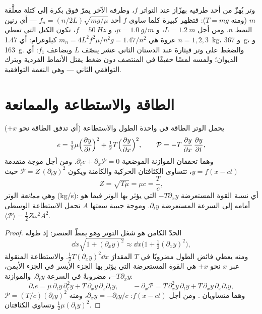 \begin{example}\label{ex:b2:waves-on-strings:melde}
وتر يُهزّ من أحد طرفيه بهزّاز عند التواتر $f$، وطرفه الآخر
يمرّ فوق بكرة إلى كتلة معلَّقة $m$ (ومنه $T = mg$): فتظهر  كبيرة كلما ساوى $f$ أحد $f_n = (n/2L)
\sqrt{mg/\mu}$ --- أي رنين النمط $n$. ومن أجل $L = \qty{1.2}{m}$، و $\mu =
\qty{1.0}{g/m}$، و $f = \qty{50}{Hz}$، تكون الكتل التي تعطي $n = 1, 2, 3$ عروة
هي $m_n = 4L^2f^2\mu/n^2g = 1.47/n^2$ كيلوغرام: أي \qty{1.47}{kg}، و \qty{367}{g}، و \qty{163}{g}.
والضغط على وتر قيثارة عند الدستان الثاني عشر ينصّف $L$ ويضاعف
$f_1$: أي الديوان؛ ولمسه لمسًا خفيفًا في المنتصف دون ضغط
يقتل الأنماط الفردية ويترك التوافقي الثاني --- وهي النغمة التوافقية.
\end{example}

\section{الطاقة والاستطاعة والممانعة}

\begin{proposition}\label{prop:b2:waves-on-strings:energy}
يحمل الوتر الطاقة في واحدة الطول والاستطاعة (أي تدفق الطاقة
نحو $+x$)
\[
e = \tfrac12\mu\Bigl(\frac{\partial y}{\partial t}\Bigr)^2 + \tfrac12T\Bigl(\frac{\partial y}{\partial x}\Bigr)^2 ,
\qquad
\mathcal P = -T\,\frac{\partial y}{\partial x}\,\frac{\partial y}{\partial t} ,
\]
وهما تحققان الموازنة الموضعية $\partial_te + \partial_x\mathcal P = 0$. ومن أجل
موجة متقدمة $y = f(x - ct)$، تتساوى الكثافتان الحركية والكامنة
ويكون $\mathcal P = Z\,(\partial_ty)^2$ حيث
\[
Z = \sqrt{T\mu} = \mu c = \frac Tc ,
\]
وهي \emph{ممانعة} الوتر (\unit{kg/s}): أي نسبة القوة
المستعرضة $-T\partial_xy$ التي يؤثر بها الوتر فيما هو أمامه
إلى السرعة المستعرضة $\partial_ty$. وموجة جيبية سعتها $A$
تحمل الاستطاعة الوسطى $\langle\mathcal P\rangle = \tfrac12Z\omega^2A^2$.
\end{proposition}

\begin{proof}
الحدّ الكامن هو شغل التوتر وهو يمطّ العنصر:
إذ طوله
\[
\dd x\sqrt{1 + (\partial_xy)^2} \approx \dd x\bigl(1 + \tfrac12(\partial_xy)^2\bigr) ,
\]
ومنه يعطي فائض الطول مضروبًا في $T$ المقدارَ $\tfrac12T(\partial_xy)^2\dd x$. والاستطاعة
المنقولة عبر $x$ نحو $+x$ هي القوة المستعرضة التي يؤثر بها
الجزء الأيسر في الجزء الأيمن، $-T\partial_xy$، مضروبةً في السرعة
$\partial_ty$. والموازنة:
\[
\partial_te = \mu\,\partial_ty\,\partial_t^2y + T\,\partial_xy\,\partial_x\partial_ty ,
\qquad
-\partial_x\mathcal P = T\,\partial_x^2y\,\partial_ty + T\,\partial_xy\,\partial_x\partial_ty ,
\]
وهما متساويان . ومن أجل $f(x - ct)$: $\partial_xy = -\partial_ty/c$، ومنه $\mathcal P = (T/c)
(\partial_ty)^2$ وتساوي الكثافتان $\tfrac12\mu(\partial_ty)^2$.
\end{proof}

